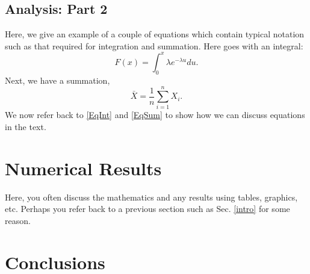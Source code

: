 \documentclass[conference]{IEEEtran}
\begin{document}
\subsection{Analysis: Part 2}\label{analysis2}
Here, we give an example of a couple of equations which contain typical notation such as that required for integration and summation. Here goes with an integral:
\begin{equation}\label{EqInt}
F(x)=\int_0^x \lambda e^{-\lambda u} du.
\end{equation}
Next, we have a summation,
\begin{equation}\label{EqSum}
\bar{X}=\frac{1}{n} \sum_{i=1}^n X_i.
\end{equation}	
We now refer back to \eqref{EqInt} and \eqref{EqSum} to show how we can discuss equations in the text.
\section{Numerical Results}\label{NumRes}
 Here, you often discuss the mathematics and any results using tables, graphics, etc. Perhaps you refer back to a previous section such as Sec. \ref{intro} for some reason.
 \section{Conclusions}\label{Conc}
\end{document}
